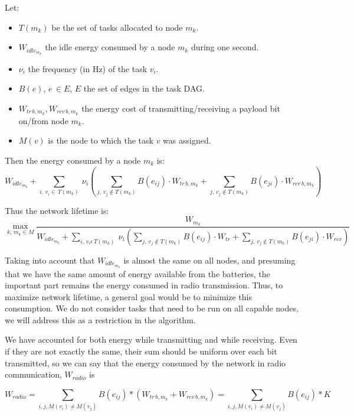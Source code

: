 Let:
\begin{itemize}
 \item $T(m_k)$ be the set of tasks allocated to node $m_k$.
 \item $W_{idle_{m_k}}$ the idle energy consumed by a node $m_k$ during one second.
 \item $\nu_{i}$ the frequency (in Hz) of the task $v_i$.
 \item $B(e)$, $e\,\in E$, $E$ the set of edges in the task DAG.
 \item $W_{tr\,b,m_k}$,$\,W_{rcv\,b,m_k}$ the energy cost of transmitting/receiving a payload bit on/from node $m_k$.
 \item $M(v)$ is the node to which the task $v$ was assigned.
\end{itemize}

Then the energy consumed by a node $m_k$ is:
\begin{equation}
W_{idle_{m_k}} + \sum_{i,\,v_i\in\,T(m_k)}\:\nu_i(\sum_{j,\,v_j\notin T(m_k)}B(e_{ij}) \cdot W_{tr\,b,m_k}+
\sum_{j,\,v_j\notin T(m_k)}B(e_{ji}) \cdot W_{rcv\,b,m_k})
\end{equation}

Thus the network lifetime is:
\begin{equation}
\max_{k,\,m_k\in M} \frac{W_{m_k}}{\displaystyle
W_{idle_{m_k}} + \sum_{i,\,v_i\epsilon\,T(m_k)}\:\nu_i(\sum_{j,\,v_j\notin T(m_k)}B(e_{ij}) \cdot W_{tr}+
\sum_{j,\,v_j\notin T(m_k)}B(e_{ji}) \cdot W_{rcv})}
\end{equation}

Taking into account that $W_{idle_{m_k}}$ is almost the same on all nodes, and presuming that we have the same amount of energy
available from the batteries, the important part remains the energy consumed in radio transmission. Thus, to maximize network lifetime,
a general goal would be to minimize this consumption. We do not consider tasks that need to be run on all capable nodes, we will 
address this as a restriction in the algorithm.

We have accounted for both energy while transmitting and while receiving. Even if they are not exactly the same, their sum should be uniform
over each bit transmitted, so we can say that the energy consumed by the network in radio communication, $W_{radio}$ is

\begin{equation}
W_{radio} = \sum_{i,j, M(v_i) \neq M(v_j)} B(e_{ij}) * (W_{tr\,b,m_k} + W_{rcv\,b,m_k}) = 
\sum_{i,j, M(v_i) \neq M(v_j)} B(e_{ij}) * K 
\end{equation}

